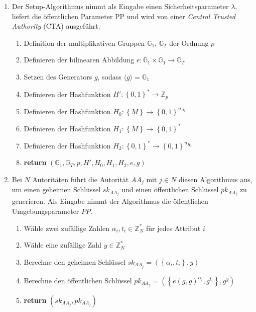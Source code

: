 \begin{enumerate}
	\item {} Der
		Setup-Algorithmus nimmt als Eingabe einen Sicherheitsparameter $\lambda$,
		liefert die öffentlichen Parameter $\text{PP}$ und wird von einer
		\textit{Central Trusted Authority} (CTA) ausgeführt.
		\begin{enumerate}
			\item Definition der multiplikativen Gruppen $\mathbb{G}_1$,
				$\mathbb{G}_T$ der Ordnung $p$
			\item Definieren der bilinearen Abbildung $e: \mathbb{G}_1 \times
				\mathbb{G}_1 \to \mathbb{G}_T$ 
			\item Setzen des Generators $g$, sodass $\langle g \rangle = \mathbb{G}_1$
			\item Definieren der Hashfunktion $H' : \left\{ 0,1 \right\}^* \to
				\mathbb{Z}_p$
			\item Definieren der Hashfunktion $H_0 : \left\{ M \right\} \to
				\left\{ 0,1 \right\}^{n_{H_0}}$
			\item Definieren der Hashfunktion $H_1 : \left\{ M \right\} \to
				\left\{ 0,1 \right\}^*$
			\item Definieren der Hashfunktion $H_2 : \left\{ 0,1 \right\}^* \to
				\left\{ 0,1 \right\}^{n_{H_2}}$
			\item \textbf{return} $\left( \mathbb{G}_1, \mathbb{G}_T, p, H', H_0, H_1,
				H_2, e, g\right)$
		\end{enumerate}

	\item {} Bei $N$
		Autoritäten führt die Autorität $AA_j$ mit $j \in N$ diesen Algorithmus
		aus, um einen geheimen Schlüssel $sk_{AA_j}$ und einen öffentlichen
		Schlüssel $pk_{AA_j}$ zu generieren. Als Eingabe nimmt der Algorithmus die
		öffentlichen Umgebungsparameter $PP$.
		\begin{enumerate}
			\item Wähle zwei zufällige Zahlen $\alpha_i, t_i \in \mathbb{Z}^*_N$ für
				jedes Attribut $i$
			\item Wähle eine zufällige Zahl $y \in \mathbb{Z}^*_N$
			\item Berechne den geheimen Schlüssel $sk_{AA_j} = \left(
				\left\{\alpha_i, t_i\right\}, y \right)$
			\item Berechne den öffentlichen Schlüssel $pk_{AA_j} = \left(
				\left\{ e(g, g)^{\alpha_i}, g^{t_i} \right\}, g^y \right)$ 
			\item \textbf{return} $\left( sk_{AA_j}, pk_{AA_j} \right)$
		\end{enumerate}


\end{enumerate}
